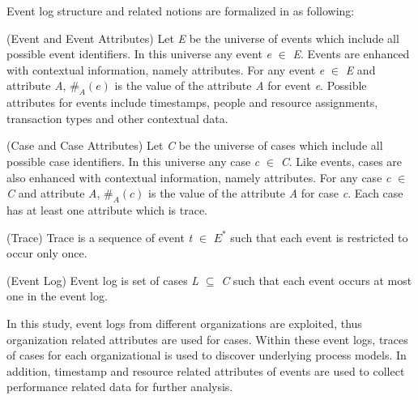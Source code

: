 Event log structure and related notions are formalized in \cite{van2011process} as following:

\theoremstyle{definition}
\begin{definition}{}
(Event and Event Attributes) Let \textit{E} be the universe of events which include all possible event identifiers. In this universe any event \textit{e} $\in$ \textit{E}. Events are enhanced with contextual information, namely attributes. For any event \textit{e} $\in$ \textit{E} and attribute \textit{A}, $\#_\textit{A}(\textit{e})$ is the value of the attribute \textit{A} for event \textit{e}. Possible attributes for events include timestamps, people and resource assignments, transaction types and other contextual data.
\end{definition}

\theoremstyle{definition}
\begin{definition}{}
(Case and Case Attributes) Let \textit{C} be the universe of cases which include all possible case identifiers. In this universe any case \textit{c} $\in$ \textit{C}. Like events, cases are also enhanced with contextual information, namely attributes. For any case \textit{c} $\in$ \textit{C} and attribute \textit{A}, $\#_\textit{A}(\textit{c})$ is the value of the attribute \textit{A} for case \textit{c}. Each case has at least one attribute which is trace.
\end{definition}

\theoremstyle{definition}
\begin{definition}{}
(Trace) Trace is a sequence of event \textit{t} $\in$ $\textit{E}^*$ such that each event is restricted to occur only once.
\end{definition}

\theoremstyle{definition}
\begin{definition}{}
(Event Log) Event log is set of cases \textit{L} $\subseteq$ \textit{C} such that each event occurs at most one in the event log.
\end{definition}

In this study, event logs from different organizations are exploited, thus organization related attributes are used for cases. Within these event logs, traces of cases for each organizational is used to discover underlying process models. In addition, timestamp and resource related attributes of events are used to collect performance related data for further analysis.

